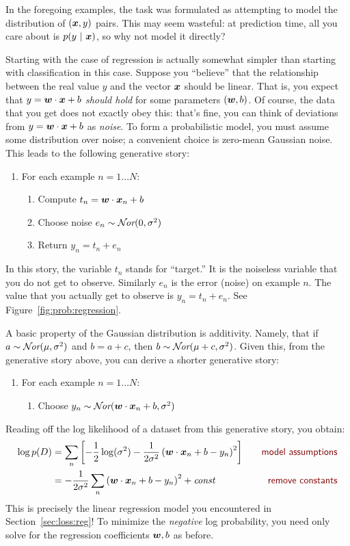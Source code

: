 In the foregoing examples, the task was formulated as attempting to
model the  distribution of $({\boldsymbol{x}},y)$ pairs.  This may
seem wasteful: at prediction time, all you care about is $p(y\textrm{~}\arrowvert\textrm{~}{\boldsymbol{x}})$,
so why not model it directly?

Starting with the case of regression is actually somewhat simpler than
starting with classification in this case.  Suppose you ``believe''
that the relationship between the real value $y$ and the vector ${\boldsymbol{x}}$
should be linear.  That is, you expect that $y = {\boldsymbol{w}} \cdot {\boldsymbol{x}}+b$
\emph{should hold} for some parameters $({\boldsymbol{w}},b)$.  Of course, the data
that you get does not exactly obey this: that's fine, you can think of
deviations from $y = {\boldsymbol{w}} \cdot {\boldsymbol{x}}+b$ as \emph{noise}.  To form a
probabilistic model, you must assume some distribution over noise; a
convenient choice is zero-mean Gaussian noise.  This leads to the
following generative story:
%
\begin{enumerate}
  \item For each example $n=1 \dots N$:
    \begin{enumerate}
      \item Compute $t_n = {\boldsymbol{w}} \cdot {\boldsymbol{x}}_n + b$
      \item Choose noise $e_n \sim \mathcal{N}\hspace{-0.5mm}\textit{or}(0, \sigma^2)$
      \item Return $y_n = t_n + e_n$
    \end{enumerate}
\end{enumerate}
%
In this story, the variable $t_n$ stands for ``target.''  It is the
noiseless variable that you do not get to observe.  Similarly $e_n$ is
the error (noise) on example $n$.  The value that you actually get to
observe is $y_n = t_n + e_n$.  See Figure~\ref{fig:prob:regression}.


A basic property of the Gaussian distribution is additivity.  Namely,
that if $a \sim \mathcal{N}\hspace{-0.5mm}\textit{or}(\mu,\sigma^2)$ and $b = a + c$, then $b \sim
\mathcal{N}\hspace{-0.5mm}\textit{or}(\mu+c,\sigma^2)$.  Given this, from the generative story above, you
can derive a shorter generative story:
%
\begin{enumerate}
  \item For each example $n=1 \dots N$:
    \begin{enumerate}
      \item Choose $y_n \sim \mathcal{N}\hspace{-0.5mm}\textit{or}( {\boldsymbol{w}} \cdot {\boldsymbol{x}}_n + b, \sigma^2)$
    \end{enumerate}
\end{enumerate}
%
Reading off the log likelihood of a dataset from this generative
story, you obtain:
%
\begin{align}
   \log p(D)
&= \sum_n \left[
     - \frac 1 2 \log(\si^2)
     - \frac 1 {2 \si^2} \left( \dotp{\vw}{\vx_n} + b - y_n \right)^2
     \right]
   \becauseof{model assumptions}\\
&= - \frac 1 {2 \si^2}  \sum_n \left( \dotp{\vw}{\vx_n} + b - y_n \right)^2
   + \textit{const}
   \becauseof{remove constants}
\end{align}
%
This is precisely the linear regression model you encountered in
Section~\ref{sec:loss:reg}!  To minimize the \emph{negative} log
probability, you need only solve for the regression coefficients
${\boldsymbol{w}},b$ as before.

